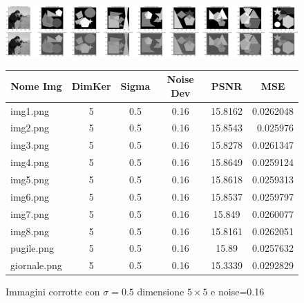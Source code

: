 \begin{figure}[H]
    \centering
    \begin{minipage}[h]{\textwidth}
    \includegraphics[width=\linewidth]{output/tabCorrotte/imgcorr4.png}\label{fig:imgcorrotte4}
    \end{minipage}
    \begin{minipage}[h]{\textwidth}
        \centering
        
        \begin{tabular}{|l c c c c r|}
            \hline
            \multicolumn{1}{|c}{\textbf{Nome Img}} & \multicolumn{1}{|c}{\textbf{DimKer}} & \multicolumn{1}{|c}{\textbf{Sigma}} & \multicolumn{1}{|c}{\textbf{Noise Dev}} & \multicolumn{1}{|c}{\textbf{PSNR}} & \multicolumn{1}{|c|}{\textbf{MSE}} \\ \hline
                img1.png & 5 & 0.5 & 0.16 & 15.8162 & 0.0262048 \\
                img2.png & 5 & 0.5 & 0.16 & 15.8543 & 0.025976 \\
                img3.png & 5 & 0.5 & 0.16 & 15.8278 & 0.0261347 \\
                img4.png & 5 & 0.5 & 0.16 & 15.8649 & 0.0259124 \\
                img5.png & 5 & 0.5 & 0.16 & 15.8618 & 0.0259313 \\
                img6.png & 5 & 0.5 & 0.16 & 15.8537 & 0.0259797 \\
                img7.png & 5 & 0.5 & 0.16 & 15.849 & 0.0260077 \\
                img8.png & 5 & 0.5 & 0.16 & 15.8161 & 0.0262051 \\
                pugile.png & 5 & 0.5 & 0.16 & 15.89 & 0.0257632 \\
                giornale.png & 5 & 0.5 & 0.16 & 15.3339 & 0.0292829 \\ \hline
            \end{tabular}\label{tab:tabcorrotte4}
        
        \end{minipage}
    \captionsetup{labelformat=andtable}
    \caption{Immagini corrotte con $\sigma = 0.5$ dimensione $5 \times 5$ e noise=0.16}
\end{figure}


